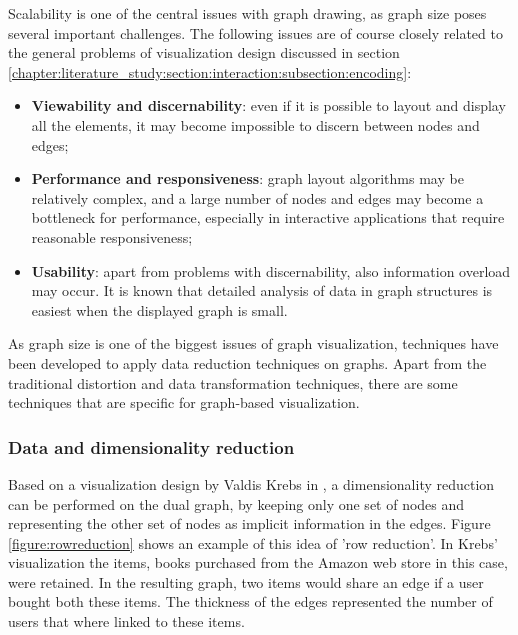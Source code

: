 Scalability is one of the central issues with graph drawing, as graph size poses several important challenges\cite{herman:2000}. The following issues are of course closely related to the general problems of visualization design discussed in section \ref{chapter:literature_study:section:interaction:subsection:encoding}:

\begin{itemize}
	\item \textbf{Viewability and discernability}: even if it is possible to layout and display all the elements, it may become impossible to discern between nodes and edges;
	\item \textbf{Performance and responsiveness}: graph layout algorithms may be relatively complex, and a large number of nodes and edges may become a bottleneck for performance, especially in interactive applications that require reasonable responsiveness;
	\item \textbf{Usability}: apart from problems with discernability, also information overload may occur. It is known that detailed analysis of data in graph structures is easiest when the displayed graph is small.
\end{itemize}


As graph size is one of the biggest issues of graph visualization, techniques have been developed to apply data reduction techniques on graphs\cite{herman:2000, shirley:2009}. Apart from the traditional distortion and data transformation techniques, there are some techniques that are specific for graph-based visualization.

\subsubsection{Data and dimensionality reduction}

Based on a visualization design by Valdis Krebs in \cite{steele:2010}, a dimensionality reduction can be performed on the dual graph, by keeping only one set of nodes and representing the other set of nodes as implicit information in the edges. Figure \ref{figure:rowreduction} shows an example of this idea of 'row reduction'. In Krebs' visualization the items, books purchased from the Amazon web store in this case, were retained. In the resulting graph, two items would share an edge if a user bought both these items. The thickness of the edges represented the number of users that where linked to these items\cite{krebs:2012:networkthinkers, steele:2010}.

